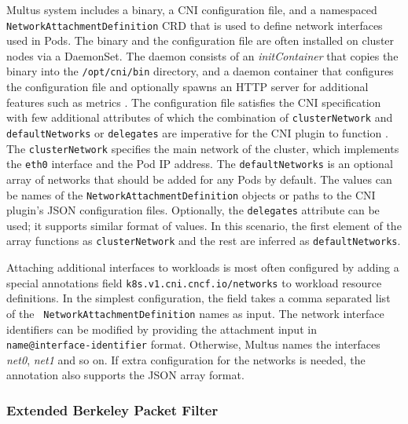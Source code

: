 \documentclass[english, 12pt, a4paper, sci, utf8, a-2b, online]{aaltothesis}
\begin{document}
Multus system includes a binary, a CNI configuration file, and a namespaced \texttt{NetworkAttachmentDefinition} CRD that is used to define network interfaces used in Pods.
The binary and the configuration file are often installed on cluster nodes via a DaemonSet.
The daemon consists of an \emph{initContainer} that copies the binary into the \texttt{/opt/cni/bin} directory, and a daemon container that configures the configuration file and optionally spawns an HTTP server for additional features such as metrics \cite{multus-cni}.
The configuration file satisfies the CNI specification with few additional attributes of which the combination of \texttt{clusterNetwork} and \texttt{defaultNetworks} or \texttt{delegates} are imperative for the CNI plugin to function \cite{multus-cni-config}.
The \texttt{clusterNetwork} specifies the main network of the cluster, which implements the \texttt{eth0} interface and the Pod IP address.
The \texttt{defaultNetworks} is an optional array of networks that should be added for any Pods by default.
The values can be names of the \texttt{NetworkAttachmentDefinition} objects or paths to the CNI plugin's JSON configuration files.
Optionally, the \texttt{delegates} attribute can be used; it supports similar format of values.
In this scenario, the first element of the array functions as \texttt{clusterNetwork} and the rest are inferred as \texttt{defaultNetworks}.

Attaching additional interfaces to workloads is most often configured by adding a special annotations field \texttt{k8s.v1.cni.cncf.io/networks} to workload resource definitions.
In the simplest configuration, the field takes a comma separated list of the \texttt{ NetworkAttachmentDefinition} names as input.
The network interface identifiers can be modified by providing the attachment input in \texttt{name@interface-identifier} format.
Otherwise, Multus names the interfaces \emph{net0}, \emph{net1} and so on.
If extra configuration for the networks is needed, the annotation also supports the JSON array format.

\subsubsection{Extended Berkeley Packet Filter}
\end{document}

